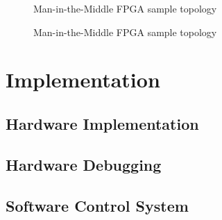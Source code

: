 \documentclass[a4paper]{report}
\begin{document}
\begin{figure}[h!]
  \caption{Man-in-the-Middle FPGA sample topology}
\end{figure}

\begin{figure}[h!]
  \caption{Man-in-the-Middle FPGA sample topology}
\end{figure}

\chapter{Implementation}

\section{Hardware Implementation}
\label{section:implementation-hardware-implementation}

\section{Hardware Debugging}
\label{section:implementation-hardware-debugging}

\section{Software Control System}
\end{document}
